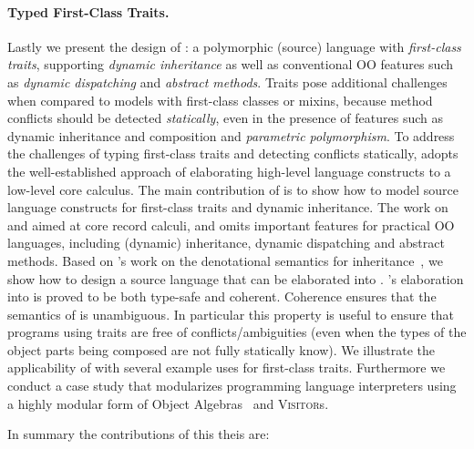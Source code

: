 \paragraph{Typed First-Class Traits.}

Lastly we present the design of \sedel: a polymorphic (source) language with
\emph{first-class traits}, supporting \emph{dynamic inheritance} as well as
conventional OO features such as \emph{dynamic dispatching} and \emph{abstract
  methods}. Traits pose additional challenges when compared to models with
first-class classes or mixins, because method conflicts should be detected
\emph{statically}, even in the presence of features such as dynamic inheritance
and composition and \emph{parametric polymorphism}. To address the challenges of
typing first-class traits and detecting conflicts statically, \sedel adopts the
well-established approach of elaborating high-level language constructs to a
low-level core calculus. The main contribution of \sedel is to show how to model
source language constructs for first-class traits and dynamic inheritance. The
work on \namee and \fnamee aimed at core record calculi, and omits important
features for practical OO languages, including (dynamic) inheritance, dynamic
dispatching and abstract methods. Based on \citeauthor{cook1989denotational}'s
work on the denotational semantics for inheritance~\citep{cook1989denotational},
we show how to design a source language that can be elaborated into \fnamee.
\sedel's elaboration into \fnamee is proved to be both type-safe and coherent.
Coherence ensures that the semantics of \sedel is unambiguous. In particular
this property is useful to ensure that programs using traits are free of
conflicts/ambiguities (even when the types of the object parts being composed
are not fully statically know). We illustrate the applicability of \sedel with
several example uses for first-class traits. Furthermore we conduct a case study
that modularizes programming language interpreters using a highly modular form
of Object Algebras~\citep{oliveira2012extensibility} and \textsc{Visitor}s.

In summary the contributions of this theis are:

